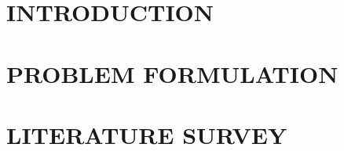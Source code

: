 \documentclass[a4paper,12pt,oneside]{article}
\begin{document}
\setlength{\baselineskip}{1.0\baselineskip}

\setlength{\baselineskip}{1.0\baselineskip}
\newpage
\begin{center}
\tableofcontents
\end{center}

\newpage
\thispagestyle{plain}
\begin{center}
\listoffigures
\end{center}

\newpage
\thispagestyle{plain}
\begin{center}
\listoftables
\end{center}

\newpage
\rfoot{\thepage}
\rfoot{\thepage}
\renewcommand{\headrulewidth}{0.0pt}
\renewcommand{\footrulewidth}{0.0pt}
\renewcommand{\headrulewidth}{0.0pt}
\renewcommand{\footrulewidth}{0.0pt}
\section{INTRODUCTION}
\paragraph{}


\newpage
\section{PROBLEM FORMULATION}
\paragraph{}

\newpage
\section{LITERATURE SURVEY}
\end{document}
